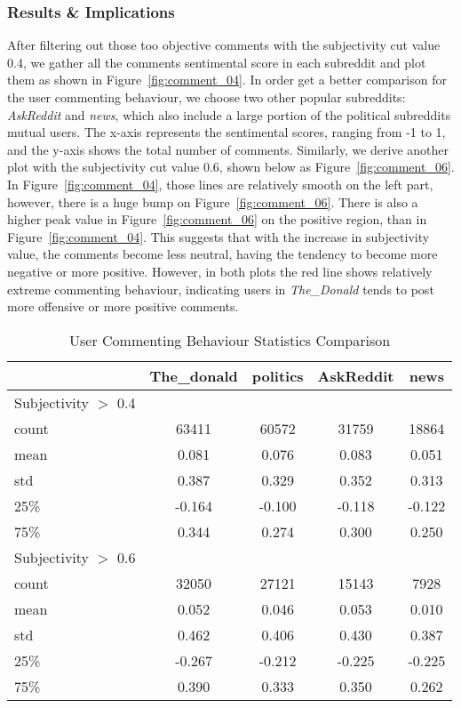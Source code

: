 \documentclass[runningheads,a4paper]{llncs}
\begin{document}
	\subsubsection{Results \& Implications}
	After filtering out those too objective comments with the subjectivity cut value 0.4, we gather all the comments sentimental score in each subreddit and plot them as shown in Figure~\ref{fig:comment_04}. In order get a better comparison for the user commenting behaviour, we choose two other popular subreddits: \textit{AskReddit} and \textit{news}, which also include a large portion of the political subreddits mutual users. The x-axis represents the sentimental scores, ranging from -1 to 1, and the y-axis shows the total number of comments. Similarly, we derive another plot with the subjectivity cut value 0.6, shown below as Figure~\ref{fig:comment_06}. In Figure~\ref{fig:comment_04}, those lines are relatively smooth on the left part, however, there is a huge bump on Figure~\ref{fig:comment_06}. There is also a higher peak value in Figure~\ref{fig:comment_06} on the positive region, than in Figure~\ref{fig:comment_04}. This suggests that with the increase in subjectivity value, the comments become less neutral, having the tendency to become more negative or more positive. However, in both plots the red line shows relatively extreme commenting behaviour, indicating users in \textit{The\_Donald} tends to post more offensive or more positive comments.
	\begin{table}
		\caption{User Commenting Behaviour Statistics Comparison}
		\centering
		\setlength{\tabcolsep}{5px}
		\begin{tabular}{l | c | c | c | c }
			\hline\hline
			& The\_donald & politics & AskReddit & news\\
			\hline
			Subjectivity $>$ 0.4 &  &  &  \\
			count & 63411  &  60572  & 31759  &  18864 \\
			mean  & 0.081  &  0.076  & 0.083  &  0.051 \\
			std   & 0.387  &   0.329 &  0.352 &   0.313 \\
			25\%  & -0.164 & -0.100  & -0.118 &  -0.122 \\
			75\%  & 0.344  & 0.274   & 0.300  &  0.250 \\
			\hline
			Subjectivity $>$ 0.6 &  &  &  \\
			count &  32050 &  27121  & 15143  & 7928 \\
			mean  &  0.052 &  0.046  & 0.053  & 0.010 \\
			std   &  0.462 &  0.406  & 0.430  & 0.387 \\
			25\%  & -0.267 & -0.212  & -0.225 & -0.225 \\
			75\%  & 0.390  & 0.333   & 0.350  & 0.262 \\
			\hline\hline
		\end{tabular}
		\label{table:comment}
	\end{table}
\end{document}
